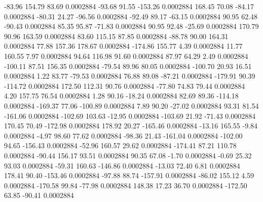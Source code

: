       -83.96      154.79       83.69     0.0002884
      -93.68       91.55     -153.26     0.0002884
      168.45       70.08      -84.17     0.0002884
      -80.31       24.27      -96.56     0.0002884
      -92.49       89.17      -63.15     0.0002884
       90.95       62.48      -90.43     0.0002884
       85.35       95.87      -71.83     0.0002884
       90.95       92.48      -25.69     0.0002884
      170.79       90.96      163.59     0.0002884
       83.60      115.15       87.85     0.0002884
      -88.78       90.00      164.31     0.0002884
       77.88      157.36      178.67     0.0002884
     -174.86      155.77        4.39     0.0002884
       11.77      160.55        7.97     0.0002884
       94.64      116.98       91.60     0.0002884
       87.97       64.29        2.49     0.0002884
     -100.11       87.51      156.35     0.0002884
      -79.54       89.96       80.05     0.0002884
     -100.70       20.93       16.51     0.0002884
        1.22       83.77      -79.53     0.0002884
       76.88       89.08      -87.21     0.0002884
     -179.91       90.39     -114.72     0.0002884
      172.50      112.31       90.76     0.0002884
      -77.80       74.83       79.44     0.0002884
        4.20      157.75       76.54     0.0002884
        1.28       90.16      -18.24     0.0002884
       82.69       89.36     -114.18     0.0002884
     -169.37       77.06     -100.89     0.0002884
        7.89       90.20      -27.02     0.0002884
       93.31       81.54     -161.06     0.0002884
     -102.69      103.63      -12.95     0.0002884
     -103.69       21.92      -71.43     0.0002884
      170.45       70.49     -172.98     0.0002884
      178.92       20.27     -165.46     0.0002884
      -13.16      165.55       -9.84     0.0002884
       -4.97       98.60       77.62     0.0002884
      -98.36       21.43     -161.04     0.0002884
     -102.00       94.65     -156.43     0.0002884
      -52.96      160.57       29.62     0.0002884
     -174.41       87.21      110.78     0.0002884
      -90.44      156.17       93.51     0.0002884
       90.35       67.08       -1.70     0.0002884
       -0.69       25.32       93.03     0.0002884
      -59.31      160.63     -146.86     0.0002884
      -13.03       72.40        6.81     0.0002884
      178.41       90.40     -153.46     0.0002884
      -97.88       88.74     -157.91     0.0002884
      -86.02      155.12        4.59     0.0002884
     -170.58       99.84      -77.98     0.0002884
      148.38       17.23       36.70     0.0002884
     -172.50       63.85      -90.41     0.0002884
